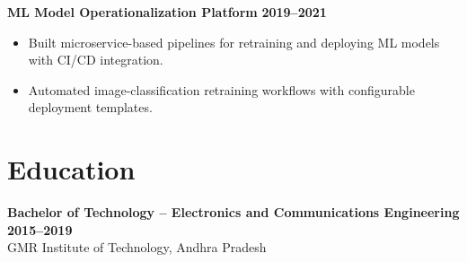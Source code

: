\documentclass[11pt]{article}
\begin{document}
\textbf{ML Model Operationalization Platform} \hfill \textbf{2019–2021}\\
\begin{itemize}[leftmargin=*,nosep]
\item Built microservice-based pipelines for retraining and deploying ML models with CI/CD integration.
\item Automated image-classification retraining workflows with configurable deployment templates.
\end{itemize}

\section{Education}
\textbf{Bachelor of Technology – Electronics and Communications Engineering} \hfill \textbf{2015–2019}\\
GMR Institute of Technology, Andhra Pradesh
\end{document}
